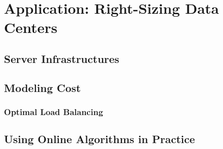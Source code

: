 
\chapter{Application: Right-Sizing Data Centers}\label{chapter:application_data_centers}

\section{Server Infrastructures}

\section{Modeling Cost}

\subsection{Optimal Load Balancing}

\section{Using Online Algorithms in Practice}
